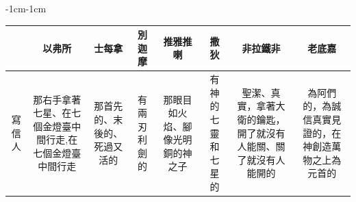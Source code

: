 \iffalse
\begin{changemargin}{-1cm}{-1cm}
\begin{table} %
\centering
\begin{tabular}{cccccccc}\hline
&以弗所  & 士每拿 & 別迦摩&推雅推喇 & 撒狄&非拉鐵非  & 老底嘉  \\\hline
\multicolumn{1}{m{.3cm}|}{寫信人}&
\multicolumn{1}{m{3cm}|}{那右手拿著七星、在七個金燈臺中間行走,在七個金燈臺中間行走}  &
\multicolumn{1}{m{2cm}|}{那首先的、末後的、死過又活的}  &
 \multicolumn{1}{m{3cm}|}{有兩刃利劍的} &
 \multicolumn{1}{m{4cm}|}{那眼目如火焰、腳像光明銅的神之子}  &
 \multicolumn{1}{m{3cm}|}{有神的七靈和七星的}   &
 \multicolumn{1}{m{3.6cm}|}{聖潔、真實，拿著大衛的鑰匙，開了就沒有人能關、關了就沒有人能開的}  &  
 \multicolumn{1}{m{3cm}|}{為阿們的，為誠信真實見證的，在神創造萬物之上為元首的} \\\hline
 

\end{tabular}
\end{table}
\end{changemargin}
